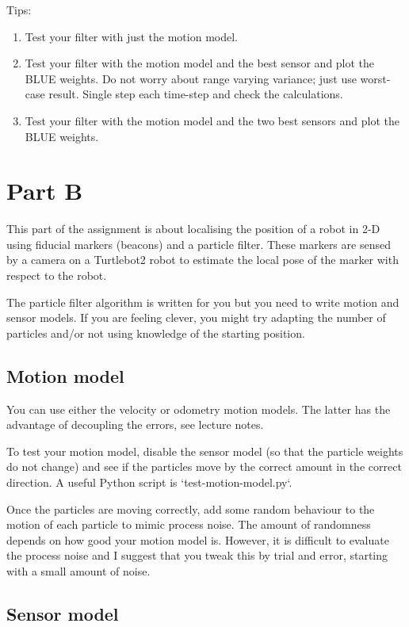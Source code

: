 \documentclass[a4paper, 12pt]{article}
\begin{document}
Tips:
%
\begin{enumerate}
\item Test your filter with just the motion model.

\item Test your filter with the motion model and the best sensor and
  plot the BLUE weights.  Do not worry about range varying variance;
  just use worst-case result.  Single step each time-step and check
  the calculations.

\item Test your filter with the motion model and the two best sensors
  and plot the BLUE weights.
\end{enumerate}


\section{Part B}

This part of the assignment is about localising the position of a
robot in 2-D using fiducial markers (beacons) and a particle filter.
These markers are sensed by a camera on a Turtlebot2 robot to estimate
the local pose of the marker with respect to the robot.


The particle filter algorithm is written for you but you need to write
motion and sensor models.  If you are feeling clever, you might try
adapting the number of particles and/or not using knowledge of the
starting position.


\subsection{Motion model}

You can use either the velocity or odometry motion models.  The latter
has the advantage of decoupling the errors, see lecture notes.

To test your motion model, disable the sensor model (so that the
particle weights do not change) and see if the particles move by the
correct amount in the correct direction.  A useful Python script is
`test-motion-model.py`.

Once the particles are moving correctly, add some random behaviour to
the motion of each particle to mimic process noise.  The amount of
randomness depends on how good your motion model is.  However, it is
difficult to evaluate the process noise and I suggest that you tweak
this by trial and error, starting with a small amount of noise.


\subsection{Sensor model}
\end{document}
